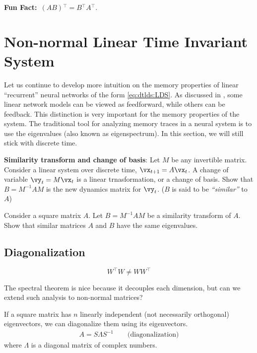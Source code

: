 \documentclass[a4paper,11pt]{exam}
\newcounter{ct}
\newcommand{\inv}{^{-1}}
\newcommand{\trp}{{^\top}} %
\newcommand{\funfact}{\textbf{Fun Fact:}~}
\begin{document}
\begin{questions}
\begin{tcolorbox}
    \funfact $(AB)\trp = B\trp A\trp$.
\end{tcolorbox}

\clearpage
\section{Non-normal Linear Time Invariant System}
Let us continue to develop more intuition on the memory properties of linear ``recurrent'' neural networks of the form \eqref{eq:dtlds:LDS}.
As discussed in \citet{Goldman2009}, some linear network models can be viewed as feedforward, while others can be feedback.
This distinction is very important for the memory properties of the system.
The traditional tool for analyzing memory traces in a neural system is to use the eigenvalues (also known as eigenspectrum).
In this section, we will still stick with discrete time.

\question \textbf{Similarity transform and change of basis}:
Let $M$ be any invertible matrix.
Consider a linear system over discrete time, $\vx_{t+1} = A\vx_t$.
A change of variable $\vy_t = M\vx_t$ is a linear trnasformation, or a change of basis.
Show that $B = M\inv A M$ is the new dynamics matrix for $\vy_t$.
($B$ is said to be \textit{``similar''} to $A$)

\question Consider a square matrix $A$. Let $B = M\inv A M$ be a similarity transform of $A$.
Show that similar matrices $A$ and $B$ have the same eigenvalues.


\subsection{Diagonalization}
\begin{tcolorbox}[colback=black!1!,title=Non-normal matrices]
    $$W\trp W \neq W W\trp$$
\end{tcolorbox}
The spectral theorem is nice because it decouples each dimension, but can we extend such analysis to non-normal matrices?
\begin{tcolorbox}[colback=black!1!,title=Diagonalization]
If a square matrix has $n$ linearly independent (not necessarily orthogonal) eigenvectors, we can diagonalize them using its eigenvectors.
\begin{align}\label{eq:eigendecomposition}
A = S \Lambda S\inv  \qquad \text{(diagonalization)}
\end{align}
where $\Lambda$ is a diagonal matrix of complex numbers.
\end{tcolorbox}


\end{questions}
\end{document}
